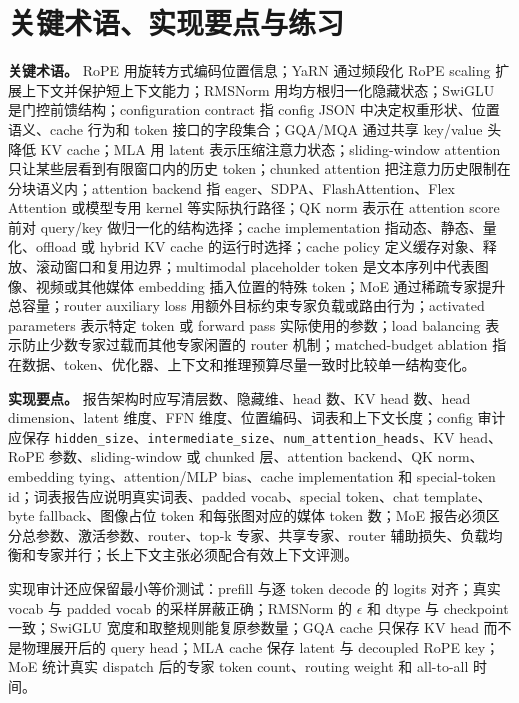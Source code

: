 \documentclass[UTF8,zihao=-4,openany]{ctexbook}
\begin{document}
\section{关键术语、实现要点与练习}
\textbf{关键术语。} RoPE 用旋转方式编码位置信息；YaRN 通过频段化 RoPE scaling 扩展上下文并保护短上下文能力；RMSNorm 用均方根归一化隐藏状态；SwiGLU 是门控前馈结构；configuration contract 指 config JSON 中决定权重形状、位置语义、cache 行为和 token 接口的字段集合；GQA/MQA 通过共享 key/value 头降低 KV cache；MLA 用 latent 表示压缩注意力状态；sliding-window attention 只让某些层看到有限窗口内的历史 token；chunked attention 把注意力历史限制在分块语义内；attention backend 指 eager、SDPA、FlashAttention、Flex Attention 或模型专用 kernel 等实际执行路径；QK norm 表示在 attention score 前对 query/key 做归一化的结构选择；cache implementation 指动态、静态、量化、offload 或 hybrid KV cache 的运行时选择；cache policy 定义缓存对象、释放、滚动窗口和复用边界；multimodal placeholder token 是文本序列中代表图像、视频或其他媒体 embedding 插入位置的特殊 token；MoE 通过稀疏专家提升总容量；router auxiliary loss 用额外目标约束专家负载或路由行为；activated parameters 表示特定 token 或 forward pass 实际使用的参数；load balancing 表示防止少数专家过载而其他专家闲置的 router 机制；matched-budget ablation 指在数据、token、优化器、上下文和推理预算尽量一致时比较单一结构变化。

\textbf{实现要点。} 报告架构时应写清层数、隐藏维、head 数、KV head 数、head dimension、latent 维度、FFN 维度、位置编码、词表和上下文长度；config 审计应保存 \texttt{hidden\_size}、\texttt{intermediate\_size}、\texttt{num\_attention\_heads}、KV head、RoPE 参数、sliding-window 或 chunked 层、attention backend、QK norm、embedding tying、attention/MLP bias、cache implementation 和 special-token id；词表报告应说明真实词表、padded vocab、special token、chat template、byte fallback、图像占位 token 和每张图对应的媒体 token 数；MoE 报告必须区分总参数、激活参数、router、top-k 专家、共享专家、router 辅助损失、负载均衡和专家并行；长上下文主张必须配合有效上下文评测。

实现审计还应保留最小等价测试：prefill 与逐 token decode 的 logits 对齐；真实 vocab 与 padded vocab 的采样屏蔽正确；RMSNorm 的 $\epsilon$ 和 dtype 与 checkpoint 一致；SwiGLU 宽度和取整规则能复原参数量；GQA cache 只保存 KV head 而不是物理展开后的 query head；MLA cache 保存 latent 与 decoupled RoPE key；MoE 统计真实 dispatch 后的专家 token count、routing weight 和 all-to-all 时间。
\end{document}
